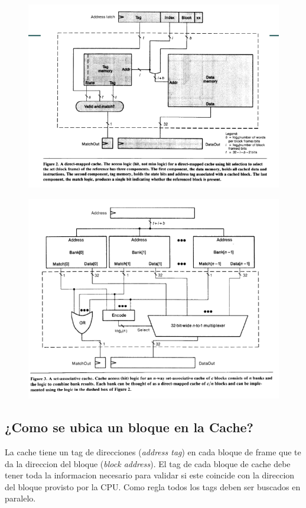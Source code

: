 \documentclass{article}
\begin{document}
\newpage
\begin{figure}[h!]
    \includegraphics[width=\linewidth]{imagenes/CacheMapeoDirecto.png}
\end{figure}
\newpage
\begin{figure}[h!]
    \includegraphics[width=\linewidth]{imagenes/CacheNWayAssosiative.png}
\end{figure}

\newpage
\subsection{¿Como se ubica un bloque en la Cache?}

La cache tiene un tag de direcciones (\textit{address tag}) en cada bloque de frame que te da la direccion del bloque (\textit{block address}).
El tag de cada bloque de cache debe tener toda la informacion necesario para validar si este coincide con la direccion del bloque provisto por la CPU.
Como regla todos los tags deben ser buscados en paralelo.
\end{document}
